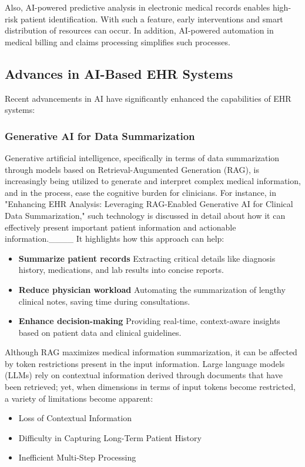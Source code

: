 Also, AI-powered predictive analysis in electronic medical records enables high-risk patient identification. With such a feature, early interventions and smart distribution of resources can occur. In addition, AI-powered automation in medical billing and claims processing simplifies such processes.
\subsection{ Advances in AI-Based EHR Systems}
Recent advancements in AI have significantly enhanced the capabilities of EHR systems:
\subsubsection{Generative AI for Data Summarization}
Generative artificial intelligence, specifically in terms of data summarization through models based on Retrieval-Augumented Generation (RAG), is increasingly being utilized to generate and interpret complex medical information, and in the process, ease the cognitive burden for clinicians. For instance, in "Enhancing EHR Analysis: Leveraging RAG-Enabled Generative AI for Clinical Data Summarization," such technology is discussed in detail about how it can effectively present important patient information and actionable information.____ It highlights how this approach can help: 
\begin{itemize}
    \item \textbf{Summarize patient records} Extracting critical details like diagnosis history, medications, and lab results into concise reports.
    \item \textbf{Reduce physician workload} Automating the summarization of lengthy clinical notes, saving time during consultations.
    \item \textbf{Enhance decision-making} Providing real-time, context-aware insights based on patient data and clinical guidelines.
\end{itemize}
Although RAG maximizes medical information summarization, it can be affected by token restrictions present in the input information. Large language models (LLMs) rely on contextual information derived through documents that have been retrieved; yet, when dimensions in terms of input tokens become restricted, a variety of limitations become apparent:
\begin{itemize}
    \item Loss of Contextual Information
    \item Difficulty in Capturing Long-Term Patient History
    \item Inefficient Multi-Step Processing
\end{itemize}
